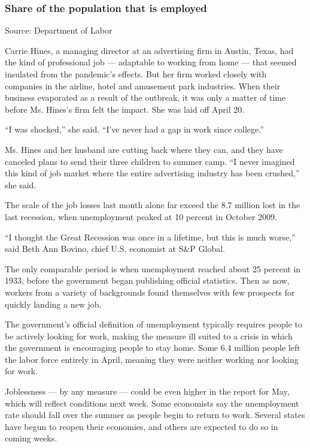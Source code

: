 \hypertarget{share-of-the-population-that-is-employed}{%
\subsubsection{Share of the population that is
employed}\label{share-of-the-population-that-is-employed}}

Source: Department of Labor

Carrie Hines, a managing director at an advertising firm in Austin,
Texas, had the kind of professional job --- adaptable to working from
home --- that seemed insulated from the pandemic's effects. But her firm
worked closely with companies in the airline, hotel and amusement park
industries. When their business evaporated as a result of the outbreak,
it was only a matter of time before Ms. Hines's firm felt the impact.
She was laid off April 20.

``I was shocked,'' she said. ``I've never had a gap in work since
college.''

Ms. Hines and her husband are cutting back where they can, and they have
canceled plans to send their three children to summer camp. ``I never
imagined this kind of job market where the entire advertising industry
has been crushed,'' she said.

The scale of the job losses last month alone far exceed the 8.7 million
lost in the last recession, when unemployment peaked at 10 percent in
October 2009.

``I thought the Great Recession was once in a lifetime, but this is much
worse,'' said Beth Ann Bovino, chief U.S. economist at S\&P Global.

The only comparable period is when unemployment reached about 25 percent
in 1933, before the government began publishing official statistics.
Then as now, workers from a variety of backgrounds found themselves with
few prospects for quickly landing a new job.

The government's official definition of unemployment typically requires
people to be actively looking for work, making the measure ill suited to
a crisis in which the government is encouraging people to stay home.
Some 6.4 million people left the labor force entirely in April, meaning
they were neither working nor looking for work.

Joblessness --- by any measure --- could be even higher in the report
for May, which will reflect conditions next week. Some economists say
the unemployment rate should fall over the summer as people begin to
return to work. Several states have begun to reopen their economies, and
others are expected to do so in coming weeks.

